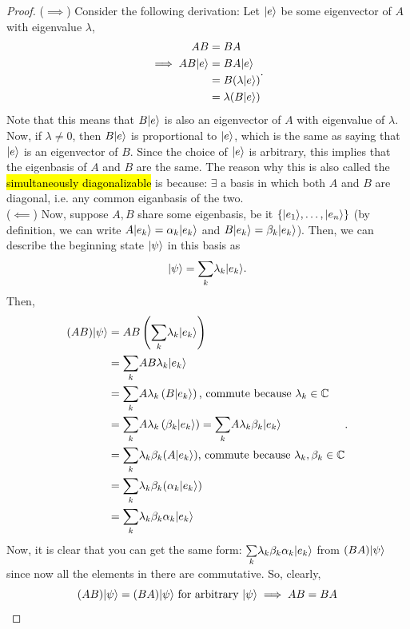 \documentclass[12pt]{article}
\begin{document}
\begin{proof}
($\implies$) Consider the following derivation: Let $\Ket{e}$ be some eigenvector of $A$ with eigenvalue $\lambda$, $$
\begin{aligned}
AB 
    &= BA\\
\implies
AB\Ket{e}
    &= BA\Ket{e}\\
    &= B(\lambda\Ket{e})\\
    &= \lambda (B\Ket{e})
\end{aligned}.
$$ Note that this means that $B\Ket{e}$ is also an eigenvector of $A$ with eigenvalue of $\lambda$. Now, if $\lambda \neq 0$, then $B\Ket{e}$ is proportional to $\Ket{e}$, which is the same as saying that $\Ket{e}$ is an eigenvector of $B$. Since the choice of $\Ket{e}$ is arbitrary, this implies that the eigenbasis of $A$ and $B$ are the same. The reason why this is also called the \hl{simultaneously diagonalizable} is because: $\exists$ a basis in which both $A$ and $B$ are diagonal, i.e. any common eiganbasis of the two.\\

\noindent ($\impliedby$) Now, suppose $A,B$ share some eigenbasis, be it $\{\Ket{e_1}, \ldots, \Ket{e_n}\}$ (by definition, we can write $A\Ket{e_k} = \alpha_k \Ket{e_k}$ and $B\Ket{e_k} = \beta_k\Ket{e_k}$). Then, we can describe the beginning state $\Ket{\psi}$ in this basis as $$
\Ket{\psi} = \underset{k}{\sum}\lambda_k \Ket{e_k}.
$$
Then, $$
\begin{aligned}
(AB)\Ket{\psi}
    &= AB\prt{\underset{k}{\sum}\lambda_k \Ket{e_k}}\\
    &= \underset{k}{\sum}AB\lambda_k \Ket{e_k}\\
    &= \underset{k}{\sum}A\lambda_k \prt{B\Ket{e_k}}\text{, commute because $\lambda_k\in \CC$}\\
    &= \underset{k}{\sum}A\lambda_k \prt{\beta_k\Ket{e_k}} = \underset{k}{\sum}A\lambda_k \beta_k\Ket{e_k}\\
    &= \underset{k}{\sum}\lambda_k \beta_k(A\Ket{e_k})\text{, commute because $\lambda_k, \beta_k\in \CC$}\\
    &= \underset{k}{\sum}\lambda_k \beta_k(\alpha_k\Ket{e_k})\\
    &= \underset{k}{\sum}\lambda_k \beta_k\alpha_k\Ket{e_k}
\end{aligned}.
$$ Now, it is clear that you can get the same form: $\underset{k}{\sum}\lambda_k \beta_k\alpha_k\Ket{e_k}$ from $(BA)\Ket{\psi}$ since now all the elements in there are commutative. So, clearly, $$
(AB)\Ket{\psi} = (BA)\Ket{\psi}\text{ for arbitrary }\Ket{\psi}\implies AB = BA
$$
\end{proof}
\end{document}

